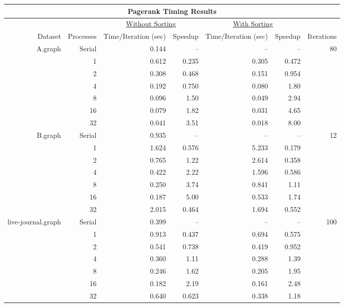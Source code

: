 \documentclass[a4paper]{article}
\begin{document}
\begin{figure}[h]
  \begin{adjustwidth}{-2.8cm}{}
  \begin{tabular}{| r | r | r r | r r | r |}
    \hline
    \multicolumn{7}{|c|}{Pagerank Timing Results} \\
    \hline
    & & \multicolumn{2}{|c|}{\underline{Without Sorting}} & \multicolumn{2}{|c|}{\underline{With Sorting}} & \\
    Dataset & Processes & \multicolumn{1}{|r}{Time/Iteration (sec)} & \multicolumn{1}{r|}{Speedup} & \multicolumn{1}{|r}{Time/Iteration (sec)} &
    \multicolumn{1}{r|}{Speedup} & Iterations\\
    \hline
    \multirow{6}{4em}{A.graph} & Serial & 0.144 & -- & -- & -- & \multirow{6}{4em}{80} \\
    & 1 & 0.612 & 0.235 & 0.305 & 0.472 & \\
    & 2 & 0.308 & 0.468 & 0.151 & 0.954 & \\
    & 4 & 0.192 & 0.750 & 0.080 & 1.80 & \\
    & 8 & 0.096 & 1.50 & 0.049 & 2.94 & \\
    & 16 & 0.079 & 1.82 &0.031 & 4.65 & \\
    & 32 & 0.041 & 3.51 & 0.018 & 8.00 & \\
    \hline
    \multirow{6}{4em}{B.graph} & Serial & 0.935 & -- & -- & -- & \multirow{6}{4em}{12}\\
    & 1 & 1.624 & 0.576 & 5.233 & 0.179 & \\
    & 2 & 0.765 & 1.22 & 2.614 & 0.358 & \\
    & 4 & 0.422 & 2.22 & 1.596 & 0.586 & \\
    & 8 & 0.250 & 3.74 & 0.841 & 1.11 & \\
    & 16 & 0.187 & 5.00 & 0.533 & 1.74 & \\
    & 32 & 2.015 & 0.464 & 1.694 & 0.552 & \\
    \hline
    \multirow{6}{8em}{live-journal.graph} & Serial & 0.399 & -- & -- & -- & \multirow{6}{4em}{100} \\
    & 1 & 0.913 & 0.437 & 0.694 & 0.575 & \\
    & 2 & 0.541 & 0.738 & 0.419 & 0.952 & \\
    & 4 & 0.360 & 1.11 & 0.288 & 1.39 & \\
    & 8 & 0.246 & 1.62 & 0.205 & 1.95 & \\
    & 16 & 0.182 & 2.19 & 0.161 & 2.48 & \\
    & 32 & 0.640 & 0.623 & 0.338 & 1.18 & \\
    \hline
  \end{tabular}
  \end{adjustwidth}
\end{figure}
\end{document}
